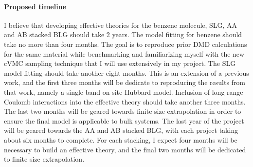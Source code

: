 \documentclass[12pt]{article}
\begin{document}
\vspace{-10pt}
\paragraph{Proposed timeline} I believe that developing effective theories for the benzene molecule, SLG, AA and AB stacked BLG should take 2 years. 
The model fitting for benzene should take no more than four months.
The goal is to reproduce prior DMD calculations for the same material while benchmarking and familiarizing myself with the new cVMC sampling technique that I will use extensively in my project.
The SLG model fitting should take another eight months.
This is an extension of a previous work, and the first three months will be dedicate to reproducing the results from that work, namely a single band on-site Hubbard model.
Inclusion of long range Coulomb interactions into the effective theory should take another three months.
The last two months will be geared towards finite size extrapolation in order to ensure the final model is applicable to bulk systems.
The last year of the project will be geared towards the AA and AB stacked BLG, with each project taking about six months to complete.
For each stacking, I expect four months will be necessary to build an effective theory, and the final two months will be dedicated to finite size extrapolation.

\begin{multicols}{2}
\begin{spacing}{0.5}
{\fontsize{10}{5}\selectfont


}
\end{spacing}
\end{multicols}
\end{document}
